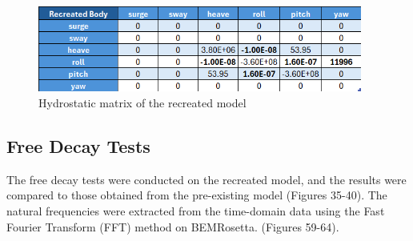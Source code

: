\documentclass[a4paper, 11pt]{article}
\begin{document}
\begin{figure}[H]
    \centering
    \includegraphics[width=0.95\textwidth]{hyd_st_re.png}
    \caption{\small Hydrostatic matrix of the recreated model}
    \label{fig:hyd_st_re}
\end{figure}

\subsection{Free Decay Tests}
\hspace*{0.5cm}The free decay tests were conducted on the recreated model, and the results were compared to those obtained from the pre-existing model (Figures 35-40). The natural frequencies were extracted from the time-domain data using the Fast Fourier Transform (FFT) method on BEMRosetta. (Figures 59-64). 
\end{document}
